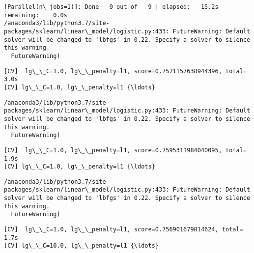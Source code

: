 \documentclass[11pt]{article}
\begin{document}
    \begin{Verbatim}[commandchars=\\\{\}]
[Parallel(n\_jobs=1)]: Done   9 out of   9 | elapsed:   15.2s remaining:    0.0s
/anaconda3/lib/python3.7/site-packages/sklearn/linear\_model/logistic.py:433: FutureWarning: Default solver will be changed to 'lbfgs' in 0.22. Specify a solver to silence this warning.
  FutureWarning)

    \end{Verbatim}

    \begin{Verbatim}[commandchars=\\\{\}]
[CV]  lg\_\_C=1.0, lg\_\_penalty=l1, score=0.7571157638944396, total=   3.0s
[CV] lg\_\_C=1.0, lg\_\_penalty=l1 {\ldots}

    \end{Verbatim}

    \begin{Verbatim}[commandchars=\\\{\}]
/anaconda3/lib/python3.7/site-packages/sklearn/linear\_model/logistic.py:433: FutureWarning: Default solver will be changed to 'lbfgs' in 0.22. Specify a solver to silence this warning.
  FutureWarning)

    \end{Verbatim}

    \begin{Verbatim}[commandchars=\\\{\}]
[CV]  lg\_\_C=1.0, lg\_\_penalty=l1, score=0.7595311984040095, total=   1.9s
[CV] lg\_\_C=1.0, lg\_\_penalty=l1 {\ldots}

    \end{Verbatim}

    \begin{Verbatim}[commandchars=\\\{\}]
/anaconda3/lib/python3.7/site-packages/sklearn/linear\_model/logistic.py:433: FutureWarning: Default solver will be changed to 'lbfgs' in 0.22. Specify a solver to silence this warning.
  FutureWarning)

    \end{Verbatim}

    \begin{Verbatim}[commandchars=\\\{\}]
[CV]  lg\_\_C=1.0, lg\_\_penalty=l1, score=0.756901679814624, total=   1.7s
[CV] lg\_\_C=10.0, lg\_\_penalty=l1 {\ldots}

    \end{Verbatim}
\end{document}
